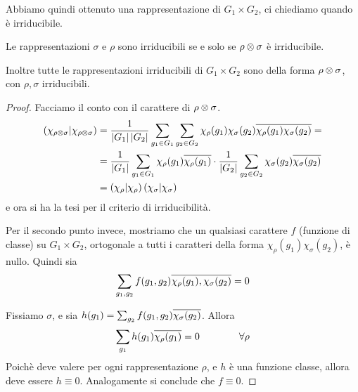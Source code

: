    Abbiamo quindi ottenuto una rappresentazione di $G_1\times G_2$, ci chiediamo quando è irriducibile. 
   \begin{myprop}
    Le rappresentazioni $\sigma$ e $\rho$ sono irriducibili se e solo se $\rho \otimes \sigma$ è irriducibile.
    
    Inoltre tutte le rappresentazioni irriducibili di $G_1\times G_2$ sono della forma $\rho \otimes \sigma$, con $\rho,\sigma$ irriducibili.
   \end{myprop}
   \begin{proof}
    Facciamo il conto con il carattere di $\rho \otimes \sigma$.
    \begin{align*}
     \left(\chi_{\rho\otimes\sigma} | \chi_{\rho\otimes\sigma}\right) &= \frac1{\left|G_1\right|\left|G_2\right|}\sum_{g_1 \in G_1}\sum_{g_2\in G_2} \chi_\rho(g_1)\chi_\sigma(g_2)\overline{\chi_\rho(g_1)\chi_\sigma(g_2)} = \\
     &= \frac1{\left|G_1\right|}\sum_{g_1 \in G_1} \chi_\rho(g_1)\overline{\chi_\rho(g_1)}\cdot\frac1{\left|G_2\right|}\sum_{g_2\in G_2}\chi_\sigma(g_2)\overline{\chi_\sigma(g_2)}\\
     &= \left(\chi_\rho | \chi_\rho\right)\left(\chi_\sigma | \chi_\sigma\right)
    \end{align*}
    e ora si ha la tesi per il criterio di irriducibilità.
    
    Per il secondo punto invece, mostriamo che un qualsiasi carattere $f$ (funzione di classe) su $G_1\times G_2$, ortogonale a tutti i caratteri della forma $\chi_\rho(g_1)\chi_\sigma(g_2)$, è nullo. Quindi sia
    \[
     \sum_{g_1,g_2} f(g_1,g_2) \overline{\chi_\rho(g_1),\chi_\sigma(g_2)}=0
    \]
    
    Fissiamo $\sigma$, e sia $h(g_1)=\sum_{g_2} f(g_1,g_2)\overline{\chi_\sigma(g_2)}$. Allora
    \[
     \sum_{g_1}h(g_1)\overline{\chi_\rho(g_1)}=0 \qquad\qquad \forall \rho
    \]
    Poichè deve valere per ogni rappresentazione $\rho$, e $h$ è una funzione classe, allora deve essere $h\equiv 0$. Analogamente si conclude che $f \equiv 0$.


   \end{proof}
